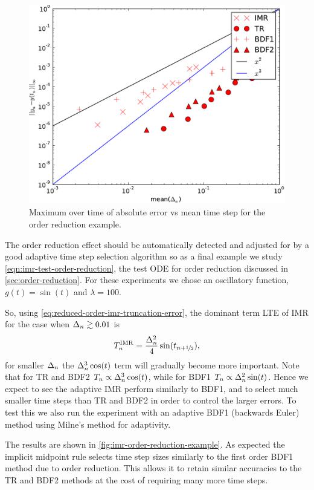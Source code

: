 \begin{figure}
  \centering  \includegraphics[width=1\textwidth]{plots/aimr_odes/order_reduction-maxoferrornormsvsmeanofdts.pdf}
  \caption{Maximum over time of absolute error vs mean time step for the order reduction example.}
  \label{fig:imr-order-reduction-convergence}
\end{figure}

The order reduction effect should be automatically detected and adjusted for by a good adaptive time step selection algorithm so as a final example we study \cref{eqn:imr-test-order-reduction}, the test ODE for order reduction discussed in \cref{sec:order-reduction}.
For these experiments we chose an oscillatory function, $g(t) = \sin(t)$ and $\lambda = 100$.

So, using \cref{eq:reduced-order-imr-truncation-error}, the dominant term LTE of IMR for the case when $\Delta_{n} \gtrsim 0.01$ is
\begin{equation}
  T_n^{\mathrm{IMR}} = \frac{\Delta_{n}^2}{4} \sin(t_{n+\nicefrac{1}{2}}),
\end{equation}
for smaller $\Delta_{n}$ the $\Delta_{n}^3 \cos(t)$ term will gradually become more important.
Note that for TR and BDF2 $T_n \propto \Delta_{n}^3 \cos(t)$, while for BDF1 $T_n \propto \Delta_{n}^2 \sin(t)$.
Hence we expect to see the adaptive IMR perform similarly to BDF1, and to select much smaller time steps than TR and BDF2 in order to control the larger errors.
To test this we also run the experiment with an adaptive BDF1 (backwards Euler) method using Milne's method for adaptivity.

The results are shown in \cref{fig:imr-order-reduction-example}.
As expected the implicit midpoint rule selects time step sizes similarly to the first order BDF1 method due to order reduction.
This allows it to retain similar accuracies to the TR and BDF2 methods at the cost of requiring many more time steps.


